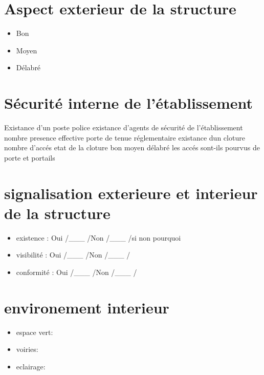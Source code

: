 \documentclass{tiba}
\begin{document}




\def\re{Oui \slash \_\_\_ \slash Non \slash \_\_\_ \slash}
\section*{Aspect exterieur de la structure}

\begin{itemize}
  \item Bon
  \item Moyen
  \item Délabré
\end{itemize}


\section*{Sécurité interne de l'établissement}
Existance d'un poste police
existance d'agents de sécurité de l'établissement
  nombre
  presence effective
  porte de tenue réglementaire
existance dun cloture
nombre d'accés
etat de la cloture bon moyen délabré
les accés sont-ils pourvus de porte et portails

\section*{signalisation exterieure et interieur de la structure}
\begin{itemize}
  \item existence : \re  si non pourquoi
  \item visibilité : \re
  \item conformité : \re
\end{itemize}


\section*{environement interieur}
\begin{itemize}
  \item espace vert: 
  \item voiries: 
  \item eclairage: 
\end{itemize}
\end{document}
